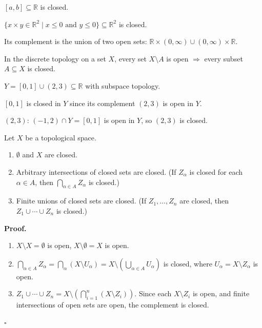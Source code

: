 \documentclass[11pt]{report}
\renewenvironment{proof}[1][Proof]{\noindent\textbf{#1.} }{\hfill$\square$\par\vspace{5pt}}
\begin{document}
\begin{exbox}
$[a, b] \subseteq \mathbb{R}$ is closed.
\end{exbox}

\begin{exbox}
$\{x \times y \in \mathbb{R}^2 \mid x \leq 0 \text{ and } y \leq 0\} \subseteq \mathbb{R}^2$ is closed.

Its complement is the union of two open sets: $\mathbb{R} \times (0, \infty) \cup (0, \infty) \times \mathbb{R}$.
\end{exbox}

\begin{exbox}
In the discrete topology on a set $X$, every set $X \setminus A$ is open $\Rightarrow$ every subset $A \subseteq X$ is closed.
\end{exbox}

\begin{exbox}
$Y = [0,1] \cup (2,3) \subseteq \mathbb{R}$ with subspace topology.

$[0,1]$ is closed in $Y$ since its complement $(2,3)$ is open in $Y$.

$(2,3)$: $(-1, 2) \cap Y = [0,1]$ is open in $Y$, so $(2,3)$ is closed.
\end{exbox}

\begin{thmbox}
Let $X$ be a topological space.
\begin{enumerate}
    \item $\emptyset$ and $X$ are closed.
    \item Arbitrary intersections of closed sets are closed. (If $Z_\alpha$ is closed for each $\alpha \in A$, then $\bigcap_{\alpha \in A} Z_\alpha$ is closed.)
    \item Finite unions of closed sets are closed. (If $Z_1, \ldots, Z_n$ are closed, then $Z_1 \cup \cdots \cup Z_n$ is closed.)
\end{enumerate}
\end{thmbox}

\begin{proof}
\begin{enumerate}
    \item $X \setminus X = \emptyset$ is open, $X \setminus \emptyset = X$ is open.
    \item $\bigcap_{\alpha \in A} Z_\alpha = \bigcap_{\alpha} (X \setminus U_\alpha) = X \setminus \left(\bigcup_{\alpha \in A} U_\alpha\right)$ is closed, where $U_\alpha = X \setminus Z_\alpha$ is open.
    \item $Z_1 \cup \cdots \cup Z_n = X \setminus \left(\bigcap_{i=1}^n (X \setminus Z_i)\right)$. Since each $X \setminus Z_i$ is open, and finite intersections of open sets are open, the complement is closed.
\end{enumerate}
\end{proof}
\end{document}
